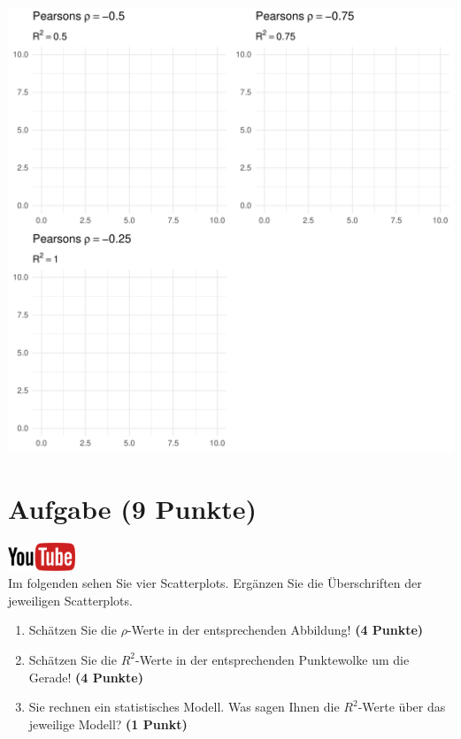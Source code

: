 \documentclass[a4paper, 9pt]{scrartcl}\usepackage[]{graphicx}\usepackage[]{xcolor}
\makeatletter
\def\maxwidth{ %
  \ifdim\Gin@nat@width>\linewidth
    \linewidth
  \else
    \Gin@nat@width
  \fi
}
\makeatother
\begin{document}
{\centering \includegraphics[width=\maxwidth]{img/correlation-01-1} 

}



 
\clearpage

\section{Aufgabe \hfill (9 Punkte)}

\hfill\href{https://youtu.be/2QJa19ZwLls}{\includegraphics[width =
  2cm]{img/youtube}}\\[1Ex]

Im folgenden sehen Sie vier Scatterplots. Erg{\"a}nzen Sie die {\"U}berschriften
der jeweiligen Scatterplots.


\begin{enumerate}
\item Sch{\"a}tzen Sie die $\rho$-Werte in der entsprechenden
  Abbildung! \textbf{(4 Punkte)}
\item Sch{\"a}tzen Sie die $R^2$-Werte in der entsprechenden
  Punktewolke um die Gerade! \textbf{(4 Punkte)}
\item Sie rechnen ein statistisches Modell. Was sagen Ihnen die $R^2$-Werte
  {\"u}ber das jeweilige Modell? \textbf{(1 Punkt)}
\end{enumerate}
\end{document}

